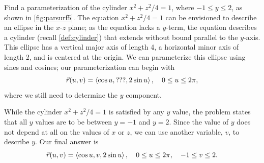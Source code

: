 \begin{example}\label{ex_parsurf5}%
Find a parameterization of the cylinder $x^2 + z^2/4=1$, where $-1\leq y\leq 2$, as shown in \autoref{fig:parsurf5}.
%
%
\solution
The equation $x^2+z^2/4=1$ can be envisioned to describe an ellipse in the $x$-$z$ plane; as the equation lacks a $y$-term, the equation describes a cylinder (recall \autoref{def:cylinder}) that extends without bound parallel to the $y$-axis. This ellipse has a vertical major axis of length 4, a horizontal minor axis of length 2, and is centered at the origin. We can parameterize this ellipse using sines and cosines; our parameterization can begin with
\[\vec r(u,v) = \left\langle \cos u, \text{???}, 2\sin u\right\rangle,\quad 0\leq u\leq 2\pi,\]
where we still need to determine the $y$ component.

While the cylinder $x^2+z^2/4=1$ is satisfied by any $y$ value, the problem states that all $y$ values are to be between $y=-1$ and $y=2$. Since the value of $y$ does not depend at all on the values of $x$ or $z$, we can use another variable, $v$, to describe $y$. Our final answer is
\[
\vec r(u,v)
= \left\langle \cos u, v, 2\sin u\right\rangle, \quad 0\leq u\leq 2\pi,\quad -1\leq v\leq 2.
\]
\end{example}

